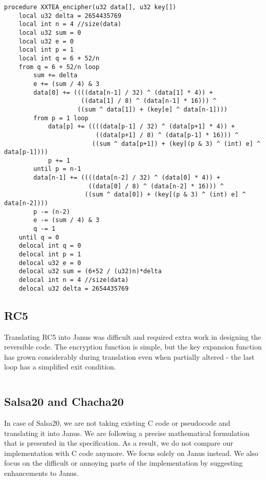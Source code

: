 \documentclass[a4paper,10pt,openright]{memoir}
\begin{document}
\begin{lstlisting}
procedure XXTEA_encipher(u32 data[], u32 key[])
    local u32 delta = 2654435769
    local int n = 4 //size(data)
    local u32 sum = 0
    local u32 e = 0
    local int p = 1
    local int q = 6 + 52/n
    from q = 6 + 52/n loop
        sum += delta
        e += (sum / 4) & 3
        data[0] += ((((data[n-1] / 32) ^ (data[1] * 4)) +
                     ((data[1] / 8) ^ (data[n-1] * 16))) ^ 
                    ((sum ^ data[1]) + (key[e] ^ data[n-1])))
        from p = 1 loop
            data[p] += ((((data[p-1] / 32) ^ (data[p+1] * 4)) + 
                         ((data[p+1] / 8) ^ (data[p-1] * 16))) ^
                        ((sum ^ data[p+1]) + (key[(p & 3) ^ (int) e] ^ data[p-1])))
            p += 1
        until p = n-1
        data[n-1] += ((((data[n-2] / 32) ^ (data[0] * 4)) +
                       ((data[0] / 8) ^ (data[n-2] * 16))) ^
                      ((sum ^ data[0]) + (key[(p & 3) ^ (int) e] ^ data[n-2])))
        p -= (n-2)
        e -= (sum / 4) & 3
        q -= 1
    until q = 0
    delocal int q = 0
    delocal int p = 1
    delocal u32 e = 0
    delocal u32 sum = (6+52 / (u32)n)*delta
    delocal int n = 4 //size(data)
    delocal u32 delta = 2654435769
\end{lstlisting}

\subsection{RC5}

Translating RC5 into Janus was difficult and required extra work in 
designing the reversible code. The encryption function is simple, but 
the key expansion function has grown considerably during translation 
even when partially altered - the last loop has a simplified exit 
condition.


\begin{lstlisting}
\end{lstlisting}

\subsection{Salsa20 and Chacha20}
\label{sec:impl:salsa}

In case of Salsa20, we are not taking existing C code or pseudocode and 
translating it into Janus. We are following a precise mathematical 
formulation that is presented in the specification\cite{salsa}. As a 
result, we do not compare our implementation with C code anymore. We 
focus solely on Janus instead. We also focus on the difficult or 
annoying parts of the implementation by suggesting enhancements to 
Janus.
\end{document}
